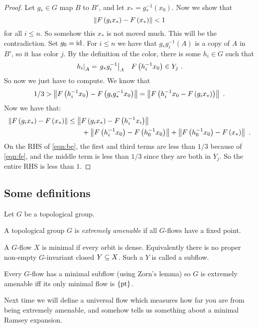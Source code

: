 \documentclass{amsart}
\begin{document}
\begin{proof}
Let $g_* \in G$ map $B$ to $B'$, and let $x_* = g^{-1}_*\left( x_0 \right)$. 
Now we show that 
\begin{equation}
\left\lVert F\left( g_i x_* \right) - F\left( x_* \right) \right\rVert < 1
\end{equation}
for all $i\leq n$.
So somehow this $x_*$ is not moved much. This will be the contradiction.
Set $g_0 = \operatorname{id}$. For $i\leq n$ we have
that $g_* g_i^{-1}\left( A \right)$ is a copy of $A$ in $B'$, so it has color $j$. 
By the definition of the color, there is some $h_i\in G$ such that 
\begin{align}
\left.h_i \right\vert_{A} = \left.g_* g_i^{-1} \right\vert_{A}
&&
F\left( h_i^{-1} x_0 \right)\in Y_j \ .
\end{align}
So now we just have to compute. We know that
\begin{equation}
1/3 > \left\lVert F\left( h_i^{-1} x_0 \right) - F\left( g_i g_*^{-1} x_0 \right) \right\rVert 
= \left\lVert F\left( h_i^{-1} x_0 - F\left( g_i x_* \right) \right) \right\rVert \ .
\label{eqn:fe}
\end{equation}
Now we have that:
\begin{align}
\left\lVert F\left( g_i x_* \right) - F\left( x_* \right) \right\rVert&\leq 
\left\lVert F\left( g_i x_* \right) - F\left( h_i^{-1} x_i \right) \right\rVert
\\ & \qquad
+ \left\lVert F\left( h_i^{-1} x_0 \right) - F\left( h_0^{-1} x_0 \right) \right\rVert
+ \left\lVert F\left( h_0^{-1} x_0 \right) - F\left( x_* \right) \right\rVert \ .
\label{eqn:be}
\end{align}
On the RHS of \eqref{eqn:be}, the first and third terms are less than $1/3$ because of
\eqref{eqn:fe}, and the middle term is less than $1/3$ since they are both in $Y_j$. So the
entire RHS is less than $1$.
\end{proof}

\subsection{Some definitions}

Let $G$ be a topological group.

\begin{defn}
A topological group $G$ is \emph{extremely amenable} if all $G$-flows have a fixed point.
\end{defn}

\begin{defn}
A $G$-flow $X$ is minimal if every orbit is dense.
Equivalently there is no proper non-empty $G$-invariant closed $Y\subseteq X$. 
Such a $Y$ is called a subflow.
\end{defn}

\begin{rmk}
Every $G$-flow has a minimal subflow (using Zorn's lemma) so
$G$ is extremely amenable iff its only minimal flow is $\left\{ \text{pt} \right\}$.
\end{rmk}

Next time we will define a universal flow
which measures how far you are from being extremely amenable, and somehow tells us
something about a minimal Ramsey expansion.
\end{document}
